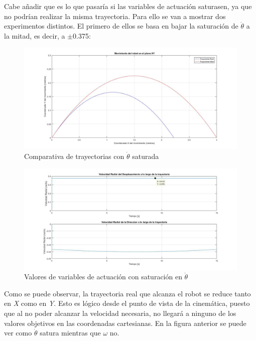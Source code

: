 \documentclass[a4paper,twoside]{article}
\begin{document}
Cabe añadir que es lo que pasaría si las variables de actuación saturasen, ya que no podrían realizar la misma trayectoria. Para ello se van a mostrar dos experimentos distintos. El primero de ellos se basa en bajar la saturación de $\dot{\theta}$ a la mitad, es decir, a $\pm$0.375:

\begin{figure}[H]
	\centering
	\includegraphics[width=1\textwidth]{parab_4}
	\caption{Comparativa de trayectorias con $\dot{\theta}$ saturada}
\end{figure}
\newpage
\begin{figure}[h!]
	\centering
	\includegraphics[width=1\textwidth]{parab_5}
	\caption{Valores de variables de actuación con saturación en $\dot{\theta}$}
\end{figure}

Como se puede observar, la trayectoria real que alcanza el robot se reduce tanto en \textit{X} como en \textit{Y}. Esto es lógico desde el punto de vista de la cinemática, puesto que al no poder alcanzar la velocidad necesaria, no llegará a ninguno de los valores objetivos en las coordenadas cartesianas. En la figura anterior se puede ver como $\dot{\theta}$ satura mientras que $\omega$ no.\\
\end{document}
